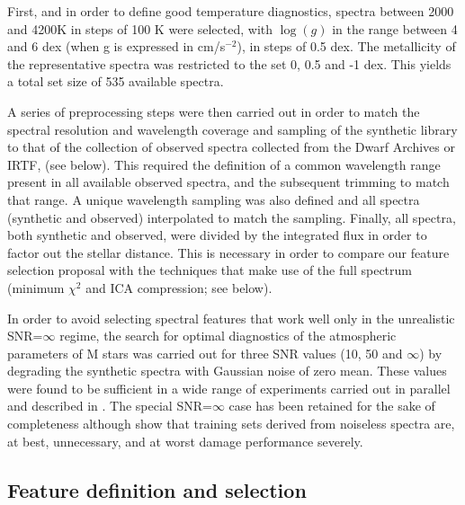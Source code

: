 First, and in order to define good temperature diagnostics, spectra
between 2000 and 4200K in steps of 100 K were selected, with $\log(g)$
in the range between 4 and 6 dex (when g is expressed in cm/s$^{-2}$),
in steps of 0.5 dex. The metallicity of the representative spectra was
restricted to the set 0, 0.5 and -1 dex.  This yields a total set size
of 535 available spectra.

A series of preprocessing steps were then carried out in order to
match the spectral resolution and wavelength coverage and sampling of
the synthetic library to that of the collection of observed spectra
collected from the Dwarf Archives or IRTF, (see below).  This required the
definition of a common wavelength range present in all available
observed spectra, and the subsequent trimming to match that range. A
unique wavelength sampling was also defined and all spectra (synthetic
and observed) interpolated to match the sampling. Finally, all
spectra, both synthetic and observed, were divided by the integrated
flux in order to factor out the stellar distance. This is necessary in
order to compare our feature selection proposal with the techniques
that make use of the full spectrum (minimum $\chi^2$ and ICA
compression; see below).

In order to avoid selecting spectral features that work well only in
the unrealistic SNR=$\infty$ regime, the search for optimal
diagnostics of the atmospheric parameters of M stars was carried out
for three SNR values (10, 50 and $\infty$) by degrading the synthetic
spectra with Gaussian noise of zero mean. These values were found to
be sufficient in a wide range of experiments carried out in parallel
and described in \cite{2017MNRAS.465.4556G}. The special SNR=$\infty$
case has been retained for the sake of completeness
although \cite{2017MNRAS.465.4556G} show that training sets derived
from noiseless spectra are, at best, unnecessary, and at worst damage
performance severely.

\subsection{Feature definition and selection}
\label{subsec:FD}

